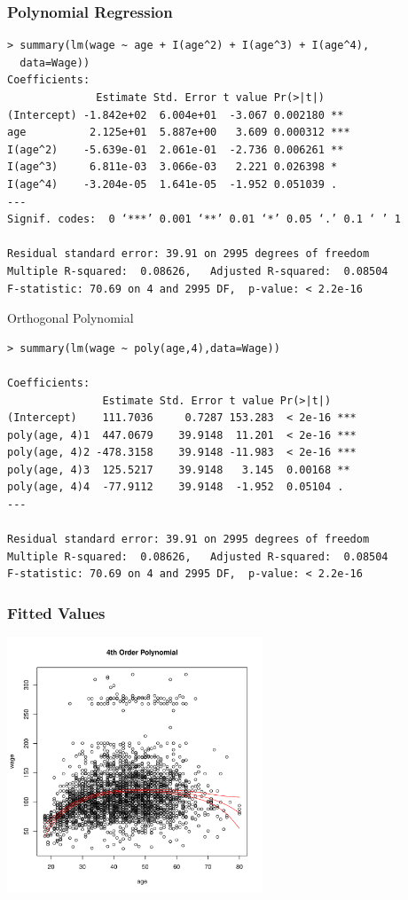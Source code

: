 \documentclass[]{beamer}
\begin{document}
\begin{frame}[fragile]\frametitle{Polynomial Regression}
\begin{verbatim}
> summary(lm(wage ~ age + I(age^2) + I(age^3) + I(age^4), 
  data=Wage))
Coefficients:
              Estimate Std. Error t value Pr(>|t|)    
(Intercept) -1.842e+02  6.004e+01  -3.067 0.002180 ** 
age          2.125e+01  5.887e+00   3.609 0.000312 ***
I(age^2)    -5.639e-01  2.061e-01  -2.736 0.006261 ** 
I(age^3)     6.811e-03  3.066e-03   2.221 0.026398 *  
I(age^4)    -3.204e-05  1.641e-05  -1.952 0.051039 .  
---
Signif. codes:  0 ‘***’ 0.001 ‘**’ 0.01 ‘*’ 0.05 ‘.’ 0.1 ‘ ’ 1

Residual standard error: 39.91 on 2995 degrees of freedom
Multiple R-squared:  0.08626,	Adjusted R-squared:  0.08504 
F-statistic: 70.69 on 4 and 2995 DF,  p-value: < 2.2e-16
\end{verbatim}

\end{frame}
\begin{frame}[fragile]{Orthogonal Polynomial}
\begin{verbatim}
> summary(lm(wage ~ poly(age,4),data=Wage))

Coefficients:
               Estimate Std. Error t value Pr(>|t|)    
(Intercept)    111.7036     0.7287 153.283  < 2e-16 ***
poly(age, 4)1  447.0679    39.9148  11.201  < 2e-16 ***
poly(age, 4)2 -478.3158    39.9148 -11.983  < 2e-16 ***
poly(age, 4)3  125.5217    39.9148   3.145  0.00168 ** 
poly(age, 4)4  -77.9112    39.9148  -1.952  0.05104 .  
---

Residual standard error: 39.91 on 2995 degrees of freedom
Multiple R-squared:  0.08626,	Adjusted R-squared:  0.08504 
F-statistic: 70.69 on 4 and 2995 DF,  p-value: < 2.2e-16
\end{verbatim}
\end{frame}
\begin{frame}\frametitle{Fitted Values}
  \centerline{\includegraphics[height=3in]{poly}}
\end{frame}
\end{document}
